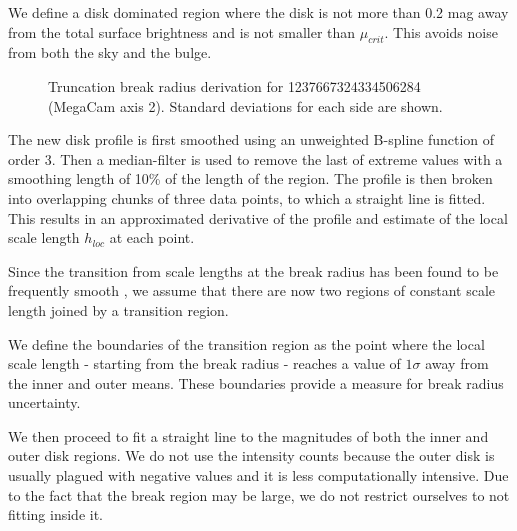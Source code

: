We define a disk dominated region where the disk is not more than 0.2 mag away from the total surface brightness and is not smaller than $\mu_{crit}$. This avoids noise from both the sky and the bulge.

\begin{figure}[h]
	\centering
	\caption{\footnotesize{Truncation break radius derivation for 1237667324334506284 (MegaCam axis 2). Standard deviations for each side are shown.}}
\end{figure}

The new disk profile is first smoothed using an unweighted B-spline function \citep{dierckx_curve_1975} of order 3. Then a median-filter is used to remove the last of extreme values with a smoothing length of 10\% of the length of the region.
The profile is then broken into overlapping chunks of three data points, to which a straight line is fitted. This results in an approximated derivative of the profile and estimate of the local scale length $h_{loc}$ at each point. 

Since the transition from scale lengths at the break radius has been found to be frequently smooth \citep{erwin_outer_2008,pohlen_stellar_2004,maltby_anti-truncated_2011}, we assume that there are now two regions of constant scale length joined by a transition region. 

We define the boundaries of the transition region as the point where the local scale length - starting from the break radius - reaches a value of $1\sigma$ away from the inner and outer means. These boundaries provide a measure for break radius uncertainty. 

We then proceed to fit a straight line to the magnitudes of both the inner and outer disk regions. We do not use the intensity counts because the outer disk is usually plagued with negative values and it is less computationally intensive. Due to the fact that the break region may be large, we do not restrict ourselves to not fitting inside it.

